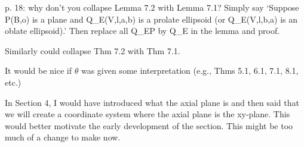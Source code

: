 p. 18: why don't you collapse Lemma 7.2 with Lemma 7.1?
	Simply say `Suppose P(B,o) is a plane and Q_E(V,l,a,b) 
	is a prolate ellipsoid (or Q_E(V,l,b,a) is an oblate ellipsoid).'
	Then replace all Q_EP by Q_E in the lemma and proof.

	Similarly could collapse Thm 7.2 with Thm 7.1.



It would be nice if $\theta$ was given some interpretation
	(e.g., Thms 5.1, 6.1, 7.1, 8.1, etc.)

In Section 4, I would have introduced what the axial plane is and
	then said that we will create a coordinate system where the
	axial plane is the xy-plane.  This would better
	motivate the early development of the section.
	This might be too much of a change to make now.